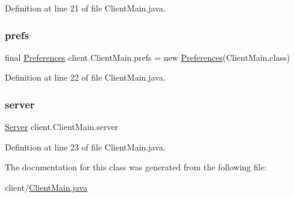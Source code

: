 Definition at line 21 of file Client\+Main.\+java.

\hypertarget{classclient_1_1_client_main_ac9b44e4112c8079879407cb8292d5fe3}{}\label{classclient_1_1_client_main_ac9b44e4112c8079879407cb8292d5fe3} 
\subsubsection{\texorpdfstring{prefs}{prefs}}
{\footnotesize\ttfamily final \hyperlink{classsharedlib_1_1utils_1_1_preferences}{Preferences} client.\+Client\+Main.\+prefs = new \hyperlink{classsharedlib_1_1utils_1_1_preferences}{Preferences}(Client\+Main.\+class)\hspace{0.3cm}{\ttfamily [static]}}



Definition at line 22 of file Client\+Main.\+java.

\hypertarget{classclient_1_1_client_main_a933025baa76b4803c185b02d359a7e15}{}\label{classclient_1_1_client_main_a933025baa76b4803c185b02d359a7e15} 
\subsubsection{\texorpdfstring{server}{server}}
{\footnotesize\ttfamily \hyperlink{classclient_1_1conn_1_1_server}{Server} client.\+Client\+Main.\+server\hspace{0.3cm}{\ttfamily [static]}}



Definition at line 23 of file Client\+Main.\+java.



The documentation for this class was generated from the following file\+:\begin{DoxyCompactItemize}
\item 
client/\hyperlink{_client_main_8java}{Client\+Main.\+java}\end{DoxyCompactItemize}
